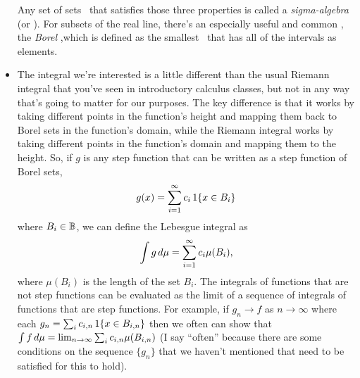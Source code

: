 \begin{itemize}
  Any set of sets \BB\ that satisfies those three properties is called
  a \emph{sigma-algebra} (or \emph{\sigmaalgebra}).  For subsets of
  the real line, there's an especially useful and common
  \sigmaalgebra, the \emph{Borel \sigmaalgebra},which is defined as
  the smallest \sigmaalgebra\ that has all of the intervals as
  elements.

\item The integral we're interested is a little different than the
  usual Riemann integral that you've seen in introductory calculus
  classes, but not in any way that's going to matter for our purposes.
  The key difference is that it works by taking different points in
  the function's height and mapping them back to Borel sets in the
  function's domain, while the Riemann integral works by taking
  different points in the function's domain and mapping them to the
  height. 
  So, if $g$ is any step function that can be written as a step
  function of Borel sets,
  \begin{equation*}
    g(x) = \sum_{i=1}^\infty c_i \operatorname{1}\{x \in B_i\}
  \end{equation*}
  where $B_i \in \mathbb{B}$, we can define the Lebesgue integral as
  \begin{equation*}
    \int g \,d\mu = \sum_{i=1}^\infty c_i \mu(B_i),
  \end{equation*}
  where $\mu(B_i)$ is the length of the set $B_i$.  The integrals of functions that
  are not step functions can be evaluated as the limit of a sequence
  of integrals of functions that are step functions.  For example, if
  $g_n \to f$ as $n \to \infty$ where each $g_n = \sum_i c_{i,n}
  \operatorname{1}\{x \in B_{i,n}\}$ then we often can show that $\int f \,d\mu =
  \lim_{n \to \infty} \sum_i c_{i,n} \mu(B_{i,n})$ (I say ``often''
  because there are some conditions on the sequence $\{g_n\}$ that we
  haven't mentioned that need to be satisfied for this to hold).


\end{itemize}
